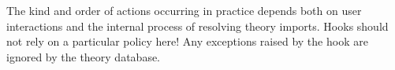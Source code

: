 \begin{isabellebody}
\begin{isamarkuptext}
\begin{description}
  The kind and order of actions occurring in practice depends both on
  user interactions and the internal process of resolving theory
  imports.  Hooks should not rely on a particular policy here!  Any
  exceptions raised by the hook are ignored by the theory database.

  \end{description}%
\end{isamarkuptext}%
\isamarkuptrue%
%
\endisatagmlref
{\isafoldmlref}%
%
\isadelimmlref
%
\endisadelimmlref
%
\isadelimtheory
%
\endisadelimtheory
%
\isatagtheory
{}\isamarkupfalse%
%
\endisatagtheory
{\isafoldtheory}%
%
\isadelimtheory
%
\endisadelimtheory
\isanewline
\end{isabellebody}%
